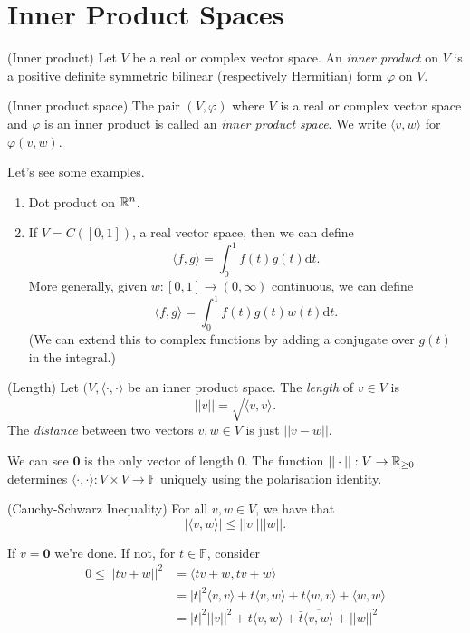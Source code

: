 \documentclass{article}
\newcommand{\F}{\mathbb{F}}
\begin{document}
\section{Inner Product Spaces}
\begin{definition}
	(Inner product) Let $ V $ be a real or complex vector space. An \textit{inner product} on $ V $ is a positive definite symmetric bilinear (respectively Hermitian) form $ \varphi $ on $ V $.
\end{definition}
\begin{definition}
	(Inner product space) The pair $ (V,\varphi) $ where $ V $ is a real or complex vector space and $ \varphi $ is an inner product is called an \textit{inner product space}. We write $ \langle v,w\rangle $ for $ \varphi(v,w) $.
\end{definition}
Let's see some examples.
\begin{enumerate}
	\item Dot product on $ \mathbb{R}^n $.
	\item If $ V=C([0,1]) $, a real vector space, then we can define
		\[
		  \langle f,g\rangle=\int_0^1f(t)g(t)\mathrm dt.
		\]
		More generally, given $ w:[0,1]\to (0,\infty) $ continuous, we can define
		\[
		  \langle f,g\rangle=\int_0^1f(t)g(t)w(t)\mathrm dt.
		\]
		(We can extend this to complex functions by adding a conjugate over $ g(t) $ in the integral.)
\end{enumerate}
\begin{definition}
	(Length) Let $ (V,\langle\cdot,\cdot\rangle $ be an inner product space. The \textit{length} of $ v\in V $ is
	\[
		||v||=\sqrt{\langle v,v\rangle}.
	\]
	The \textit{distance} between two vectors $ v,w\in V $ is just $ ||v-w|| $.
\end{definition}
\begin{remark}
	We can see $ \mathbf 0 $ is the only vector of length $ 0 $. The function $ ||\cdot ||:V\to \mathbb{R}_{\ge 0} $ determines $ \langle \cdot,\cdot\rangle:V\times V\to \F $ uniquely using the polarisation identity.
\end{remark}
\begin{lemma}
	(Cauchy-Schwarz Inequality) For all $ v,w\in V $, we have that
	\[
		|\langle v,w\rangle |\le ||v||||w||.\tag{\star}
	\]
\end{lemma}
\pf If $ v=\mathbf 0 $ we're done. If not, for $ t\in \F $, consider
\begin{align*}
	0\le ||tv+w||^2 &=\langle tv+w,tv+w\rangle\\
			&=|t|^2\langle v,v\rangle+t\langle v,w\rangle+\overline t\langle w,v\rangle + \langle w,w\rangle\\
			&=|t|^2||v||^2+t\langle v,w\rangle+\bar t\overline{\langle v,w\rangle}+||w||^2
\end{align*}
\end{document}
